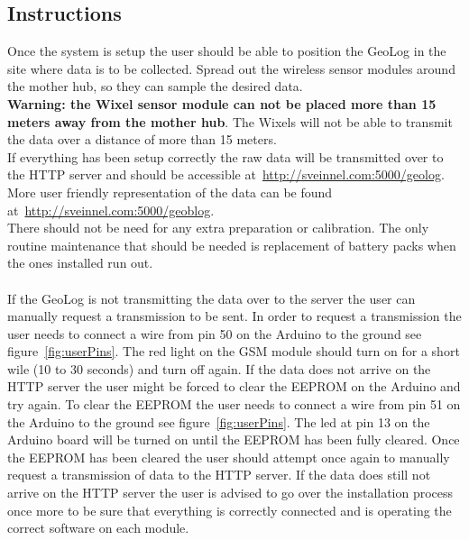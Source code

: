 \subsection{Instructions}
Once the system is setup the user should be able to position the GeoLog in the site where data is to be collected. Spread out the wireless sensor modules around the mother hub, so they can sample the desired data.\\
\textbf{Warning: the Wixel sensor module can not be placed more than 15 meters away from the mother hub}. The Wixels will not be able to transmit the data over a distance of more than 15 meters.\\
If everything has been setup correctly the raw data will be transmitted over to the HTTP server and should be accessible at~\url{http://sveinnel.com:5000/geolog}. More user friendly representation of the data can be found at~\url{http://sveinnel.com:5000/geoblog}.\\
There should not be need for any extra preparation or calibration. The only routine maintenance that should be needed is replacement of battery packs when the ones installed run out.\\\\ %
If the GeoLog is not transmitting the data over to the server the user can manually request a transmission to be sent. In order to request a transmission the user needs to connect a wire from  pin 50 on the Arduino to the ground see figure~\ref{fig:userPins}. The red light on the GSM module should turn on for a short wile (10 to 30 seconds) and turn off again. If the data does not arrive on the HTTP server the user might be forced to clear the EEPROM on the Arduino and try again. To clear the EEPROM the user needs to connect a wire from pin 51 on the Arduino to the ground see figure~\ref{fig:userPins}. The led at pin 13 on the Arduino board will be turned on until the EEPROM has been fully cleared. Once the EEPROM has been cleared the user should attempt once again to manually request a transmission of data to the HTTP server. If the data does still not arrive on the HTTP server the user is advised to go over the installation process once more to be sure that everything is correctly connected and is operating the correct software on each module.









